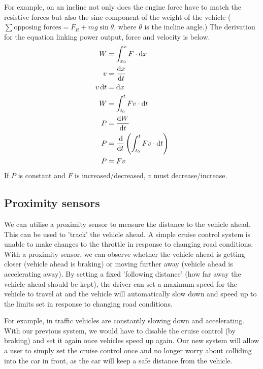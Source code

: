 \documentclass[12pt]{article}
\numberwithin{equation}{section}
\begin{document}
For example, on an incline not only does the engine force have to match the resistive forces but also the sine component of the weight of the vehicle ($\sum{\textrm{opposing forces}} = F_R + mg\sin{\theta}$, where $\theta$ is the incline angle.) The derivation for the equation linking power output, force and velocity is below.
\begin{align}
  W &= \int_{x_0}^{x} F \cdot \textrm{d}x\\
  v &= \frac{\dif x}{\dif t}\\
  v\dif t &= \dif x\\
  W &= \int_{t_0}^{t} Fv\cdot \textrm{d} t\\
  P &= \frac{\dif W}{\dif t}\\
  P &= \frac{\dif}{\dif t}\left(\int_{t_0}^{t} Fv\cdot \textrm{d} t\right)\\
  P &= Fv
\end{align}
If $P$ is constant and $F$ is increased/decreased, $v$ must decrease/increase.
\subsection*{Proximity sensors}
We can utilise a proximity sensor to measure the distance to the vehicle ahead. This can be used to 'track' the vehicle ahead. A simple cruise control system is unable to make changes to the throttle in response to changing road conditions. With a proximity sensor, we can observe whether the vehicle ahead is getting closer (vehicle ahead is braking) or moving further away (vehicle ahead is accelerating away). By setting a fixed 'following distance' (how far away the vehicle ahead should be kept), the driver can set a maximum speed for the vehicle to travel at and the vehicle will automatically slow down and speed up to the limits set in response to changing road conditions. 

For example, in traffic vehicles are constantly slowing down and accelerating. With our previous system, we would have to disable the cruise control (by braking) and set it again once vehicles speed up again. Our new system will allow a user to simply set the cruise control once and no longer worry about colliding into the car in front, as the car will keep a safe distance from the vehicle.
\end{document}
